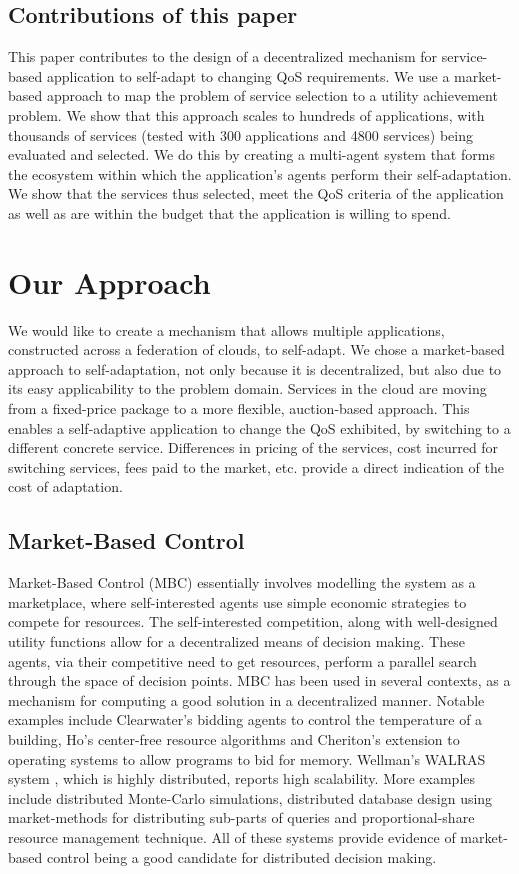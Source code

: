 \documentclass[10pt,journal,compsoc]{IEEEtran}
\begin{document}
\subsection{Contributions of this paper}
This paper contributes to the design of a decentralized mechanism for service-based application to self-adapt to changing QoS requirements. We use a market-based approach to map the problem of service selection to a utility achievement problem.  We show that this approach scales to hundreds of applications, with thousands of services (tested with 300 applications and 4800 services) being evaluated and selected. We do this by creating a multi-agent system that forms the ecosystem within which the application's agents perform their self-adaptation. We show that the services thus selected, meet the QoS criteria of the application as well as are within the budget that the application is willing to spend. 
  
\section{Our Approach}
We would like to create a mechanism that allows multiple applications, constructed across a federation of clouds, to self-adapt. We chose a market-based approach to self-adaptation, not only because it is decentralized, but also due to its easy applicability to the problem domain. Services in the cloud are moving from a fixed-price package to a more flexible, auction-based approach\cite{Amazon2010SpotInstance}. This enables a self-adaptive application to change the QoS exhibited, by switching to a different concrete service. Differences in pricing of the services, cost incurred for switching services, fees paid to the market, etc. provide a direct indication of the cost of adaptation. 
\subsection{Market-Based Control}
Market-Based Control (MBC) essentially involves modelling the system as a marketplace, where self-interested agents use simple economic strategies to compete for resources. The self-interested competition, along with well-designed utility functions allow for a decentralized means of decision making. These agents, via their competitive need to get resources, perform a parallel search through the space of decision points. MBC has been used in several contexts, as a mechanism for computing a good solution in a decentralized manner. Notable examples include Clearwater's bidding agents to control the temperature of a building\cite{Clearwater1996Saving}, Ho's center-free resource algorithms \cite{Ho1980class} and Cheriton's extension to operating systems to allow programs to bid for memory\cite{Harty1996market}. Wellman's WALRAS system \cite{Wellman1993market-oriented}, which is highly distributed, reports high scalability. More examples include distributed Monte-Carlo simulations\cite{Waldspurger1992Spawn}, distributed database design using market-methods for distributing sub-parts of queries \cite{Stonebraker1994Economic} and proportional-share resource management technique\cite{Waldspurger1994Lottery}. All of these systems provide evidence of market-based control being a good candidate for distributed decision making. 
\end{document}
